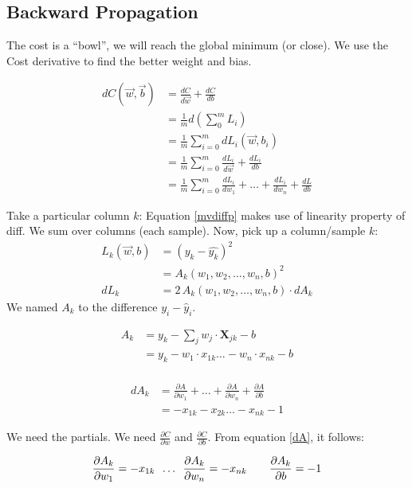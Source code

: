\subsection{Backward Propagation}

The cost is a ``bowl'', we will reach the global minimum (or close).
We use the Cost derivative to find the better weight and bias. 

\begin{align}
  dC(\vec{w}, \vec{b}) &= \frac{dC}{d\vec{w}} + \frac{dC}{db}\nonumber\\
  &= \frac{1}{m} d(\sum^m_0 L_i)\nonumber\\
  &= \frac{1}{m} \sum^m_{i=0} dL_i(\vec{w}, b_i)\label{mvdiffp}\\
  &= \frac{1}{m} \sum^m_{i=0} \frac{dL_i}{d\vec{w}} + \frac{dL_i}{db}\nonumber\\
  &= \frac{1}{m} \sum^m_{i=0} \frac{dL_i}{dw_1} +\ldots +\frac{dL_i}{dw_n} + \frac{dL}{db} \nonumber
\end{align}

Take a particular column $k$:
Equation \ref{mvdiffp} makes use of linearity property of diff. We sum over columns (each sample). Now, pick up a column/sample $k$:
\begin{align*}
  L_k(\vec{w},b) &= (y_k - \hat{y_k})^2\\
    &= A_k(w_1, w_2,\ldots, w_n, b)^2\\
  dL_k &= 2\,A_k(w_1,w_2,\ldots, w_n, b)\cdot{}dA_k
\end{align*}
We named $A_k$ to the difference $y_i-\hat{y}_i$.

\begin{align*}
  A_k  &= y_k - \sum_j w_j\cdot{}\mathbf{X}_{jk} - b \\
  &= y_k - w_1\cdot{}x_{1k} \ldots{}-w_n\cdot{}x_{nk} - b \\
\end{align*}

\begin{align}
  dA_k &= \frac{\partial A}{\partial w_1}+ \ldots + \frac{\partial A}{\partial w_n}+ \frac{\partial A}{\partial b} \nonumber\\
  &=  -x_{1k} -x_{2k} \ldots - x_{nk} -1 \label{dA}
\end{align}

We need the partials. We need $\frac{\partial C}{\partial w}$ and $\frac{\partial C}{\partial b}$. From equation \ref{dA}, it follows:

\begin{center}
\begin{align*}
  \frac{\partial A_{k}}{\partial w_1} = -x_{1k} \hspace{0.5em} \ldots \hspace{0.5em}\frac{\partial A_{k}}{\partial w_n}= -x_{nk}\hspace{2em} \frac{\partial A_k}{\partial b} = -1
\end{align*} 
\end{center}

